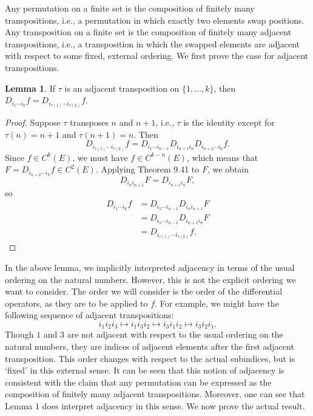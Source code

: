 \documentclass[12pt]{article}
\theoremstyle{definition}
\newtheorem{lemma}{Lemma}
\begin{document}
Any permutation on a finite set is the composition of finitely many transpositions, i.e., a permutation in which exactly two elements swap positions. Any transposition on a finite set is the composition of finitely many adjacent transpositions, i.e., a transposition in which the swapped elements are adjacent with respect to some fixed, external ordering. We first prove the case for adjacent transpositions.

\begin{lemma}
    If $\tau$ is an adjacent transposition on $\{1, \dots, k\}$, then $D_{i_1 \cdots i_k}f = D_{i_{\tau(1)} \cdots i_{\tau(k)}}f$.
\end{lemma}

\begin{proof}
    Suppose $\tau$ transposes $n$ and $n+1$, i.e., $\tau$ is the identity except for $\tau(n) = n + 1$ and $\tau(n + 1) = n$. Then
    \[
        D_{i_{\tau(1)} \cdots i_{\tau(k)}} f = D_{i_1 \cdots i_{n-1}} D_{i_{n+1}i_n} D_{i_{n+2} \cdots i_k} f.
    \]
    Since $f \in C^k(E)$, we must have $f \in C^{k - n}(E)$, which means that $F = D_{i_{n+2} \cdots i_k} f \in C^{2}(E)$. Applying Theorem 9.41 to $F$, we obtain
    \[
        D_{i_ni_{n+1}} F = D_{i_{n+1}i_n} F,
    \]
    so
    \begin{align*}
        D_{i_1 \cdots i_k}f
            &= D_{i_1 \cdots i_{n-1}} D_{i_ni_{n+1}} F \\
            &= D_{i_1 \cdots i_{n-1}} D_{i_{n+1}i_n} F \\
            &= D_{i_{\tau(1)} \cdots i_{\tau(k)}} f.
    \end{align*}

\end{proof}

In the above lemma, we implicitly interpreted adjacency in terms of the usual ordering on the natural numbers. However, this is not the explicit ordering we want to consider. The order we will consider is the  order of the differential operators, as they are to be applied to $f$. For example, we might have the following sequence of adjacent transpositions:
\[
    i_1i_2i_3 \mapsto i_1i_3i_2 \mapsto i_3i_1i_2 \mapsto i_3i_2i_1.
\]
Though $1$ and $3$ are not adjacent with respect to the usual ordering on the natural numbers, they are indices of adjacent elements after the first adjacent transposition. This order changes with respect to the actual subindices, but is `fixed' in this external sense. It can be seen that this notion of adjacency is consistent with the claim that any permutation can be expressed as the composition of finitely many adjacent transpositions. Moreover, one can see that Lemma 1 does interpret adjacency in this sense. We now prove the actual result.
\end{document}
